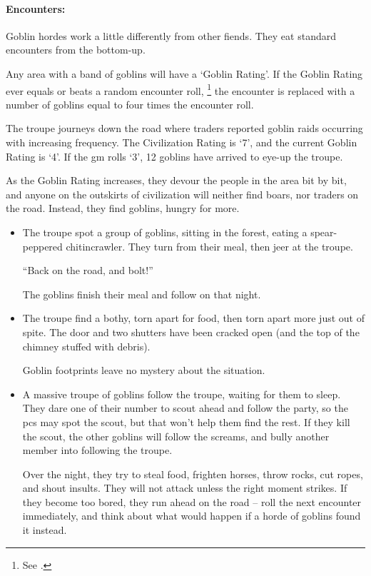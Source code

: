 \begin{multicols}{2}

\paragraph{Encounters:}

Goblin hordes work a little differently from other fiends.
They eat standard encounters from the bottom-up.

Any area with a band of goblins will have a `Goblin Rating'.
If the Goblin Rating ever equals or beats a random encounter roll,%
\footnote{See .}
the encounter is replaced with a number of goblins equal to four times the encounter roll.

\begin{exampletext}
  The troupe journeys down the road where traders reported goblin raids occurring with increasing frequency.
  The Civilization Rating is `7', and the current Goblin Rating is `4'.
  If the \gls{gm} rolls `3', 12 goblins have arrived to eye-up the troupe.
\end{exampletext}

As the Goblin Rating increases, they devour the people in the area bit by bit, and anyone on the outskirts of civilization will neither find boars, nor traders on the road.
Instead, they find goblins, hungry for more.


\begin{itemize}
  \item
  The troupe spot a group of goblins, sitting in the forest, eating a spear-peppered chitincrawler.
  They turn from their meal, then jeer at the troupe.

  ``Back on the road, and bolt!''

  The goblins finish their meal and follow on that night.
  \item
  The troupe find a bothy, torn apart for food, then torn apart more just out of spite.
  The door and two shutters have been cracked open (and the top of the chimney stuffed with debris).

  Goblin footprints leave no mystery about the situation.
  \item
  A massive troupe of goblins follow the troupe, waiting for them to sleep.
  They dare one of their number to scout ahead and follow the party, so the \glspl{pc} may spot the scout, but that won't help them find the rest.
  If they kill the scout, the other goblins will follow the screams, and bully another member into following the troupe.

  Over the night, they try to steal food, frighten horses, throw rocks, cut ropes, and shout insults.
  They will not attack unless the right moment strikes.
  If they become too bored, they run ahead on the road -- roll the next encounter immediately, and think about what would happen if a horde of goblins found it instead.
\end{itemize}

\end{multicols}

